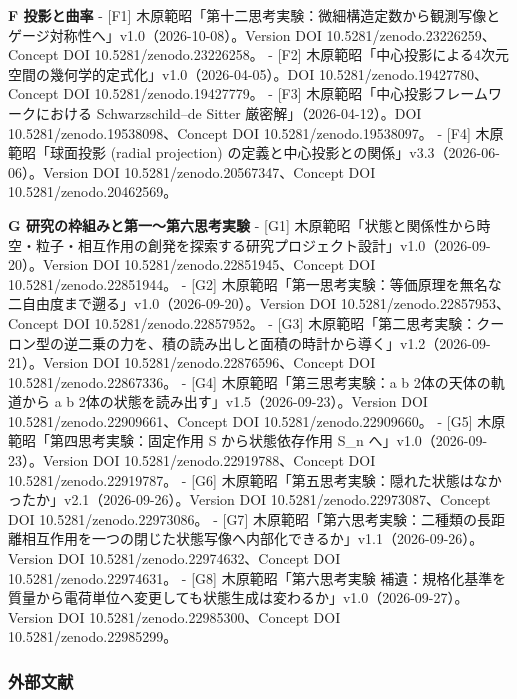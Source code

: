 \documentclass[
  a4paper,
]{ltjsarticle}
\begin{document}
\textbf{F 投影と曲率} - {[}F1{]}
木原範昭「第十二思考実験：微細構造定数から観測写像とゲージ対称性へ」v1.0（2026-10-08）。Version
DOI 10.5281/zenodo.23226259、Concept DOI 10.5281/zenodo.23226258。 -
{[}F2{]}
木原範昭「中心投影による4次元空間の幾何学的定式化」v1.0（2026-04-05）。DOI
10.5281/zenodo.19427780、Concept DOI 10.5281/zenodo.19427779。 -
{[}F3{]} 木原範昭「中心投影フレームワークにおける Schwarzschild--de
Sitter 厳密解」（2026-04-12）。DOI 10.5281/zenodo.19538098、Concept DOI
10.5281/zenodo.19538097。 - {[}F4{]} 木原範昭「球面投影 (radial
projection) の定義と中心投影との関係」v3.3（2026-06-06）。Version DOI
10.5281/zenodo.20567347、Concept DOI 10.5281/zenodo.20462569。

\textbf{G 研究の枠組みと第一〜第六思考実験} - {[}G1{]}
木原範昭「状態と関係性から時空・粒子・相互作用の創発を探索する研究プロジェクト設計」v1.0（2026-09-20）。Version
DOI 10.5281/zenodo.22851945、Concept DOI 10.5281/zenodo.22851944。 -
{[}G2{]}
木原範昭「第一思考実験：等価原理を無名な二自由度まで遡る」v1.0（2026-09-20）。Version
DOI 10.5281/zenodo.22857953、Concept DOI 10.5281/zenodo.22857952。 -
{[}G3{]}
木原範昭「第二思考実験：クーロン型の逆二乗の力を、積の読み出しと面積の時計から導く」v1.2（2026-09-21）。Version
DOI 10.5281/zenodo.22876596、Concept DOI 10.5281/zenodo.22867336。 -
{[}G4{]} 木原範昭「第三思考実験：a b 2体の天体の軌道から a b
2体の状態を読み出す」v1.5（2026-09-23）。Version DOI
10.5281/zenodo.22909661、Concept DOI 10.5281/zenodo.22909660。 -
{[}G5{]} 木原範昭「第四思考実験：固定作用 S から状態依存作用 S\_n
へ」v1.0（2026-09-23）。Version DOI 10.5281/zenodo.22919788、Concept DOI
10.5281/zenodo.22919787。 - {[}G6{]}
木原範昭「第五思考実験：隠れた状態はなかったか」v2.1（2026-09-26）。Version
DOI 10.5281/zenodo.22973087、Concept DOI 10.5281/zenodo.22973086。 -
{[}G7{]}
木原範昭「第六思考実験：二種類の長距離相互作用を一つの閉じた状態写像へ内部化できるか」v1.1（2026-09-26）。Version
DOI 10.5281/zenodo.22974632、Concept DOI 10.5281/zenodo.22974631。 -
{[}G8{]} 木原範昭「第六思考実験
補遺：規格化基準を質量から電荷単位へ変更しても状態生成は変わるか」v1.0（2026-09-27）。Version
DOI 10.5281/zenodo.22985300、Concept DOI 10.5281/zenodo.22985299。

\subsubsection{外部文献}\label{ux5916ux90e8ux6587ux732e}
\end{document}
